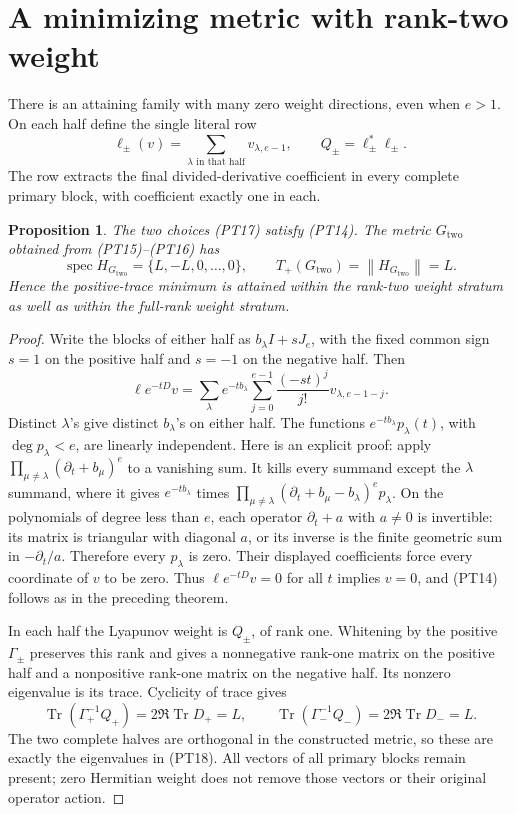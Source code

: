 \documentclass[11pt]{article}
\newcommand{\norm}[1]{\left\lVert#1\right\rVert}
\DeclareMathOperator{\Tr}{Tr}
\DeclareMathOperator{\spec}{spec}
\newtheorem{proposition}[theorem]{Proposition}
\begin{document}
\section{A minimizing metric with rank-two weight}

There is an attaining family with many zero weight directions,
even when \(e>1\). On each half define the single literal row
\begin{equation}\tag{PT17}
 \ell_\pm(v)=\sum_{\lambda\text{ in that half}}v_{\lambda,e-1},
 \qquad Q_\pm=\ell_\pm^*\ell_\pm.
\end{equation}
The row extracts the final divided-derivative coefficient in every
complete primary block, with coefficient exactly one in each.

\begin{proposition}
The two choices (PT17) satisfy (PT14). The metric
\(G_{\mathrm{two}}\) obtained from (PT15)--(PT16) has
\begin{equation}\tag{PT18}
 \spec H_{G_{\mathrm{two}}}=\{L,-L,0,\ldots,0\},\qquad
 T_+(G_{\mathrm{two}})=\norm{H_{G_{\mathrm{two}}}}=L.
\end{equation}
Hence the positive-trace minimum is attained within the rank-two
weight stratum as well as within the full-rank weight stratum.
\end{proposition}
\begin{proof}
Write the blocks of either half as \(b_\lambda I+sJ_e\), with
the fixed common sign \(s=1\) on the positive half and \(s=-1\)
on the negative half. Then
\[
 \ell e^{-tD}v
 =\sum_\lambda e^{-tb_\lambda}
      \sum_{j=0}^{e-1}\frac{(-st)^j}{j!}v_{\lambda,e-1-j}.
\]
Distinct \(\lambda\)'s give distinct \(b_\lambda\)'s on
either half. The functions \(e^{-tb_\lambda}p_\lambda(t)\),
with \(\deg p_\lambda<e\), are linearly independent. Here is
an explicit proof: apply
\(\prod_{\mu\ne\lambda}(\partial_t+b_\mu)^e\) to a
vanishing sum. It kills every summand except the \(\lambda\)
summand, where it gives \(e^{-tb_\lambda}\) times
\(\prod_{\mu\ne\lambda}(\partial_t+b_\mu-b_\lambda)^e
p_\lambda\). On the polynomials of degree less than \(e\),
each operator \(\partial_t+a\) with \(a\ne0\) is invertible:
its matrix is triangular with diagonal \(a\), or its inverse
is the finite geometric sum in \(-\partial_t/a\).
Therefore every \(p_\lambda\) is zero. Their displayed
coefficients force every coordinate of \(v\) to be zero.
Thus \(\ell e^{-tD}v=0\) for all \(t\) implies \(v=0\),
and (PT14) follows as in the preceding theorem.

In each half the Lyapunov weight is \(Q_\pm\), of rank one.
Whitening by the positive \(\Gamma_\pm\) preserves this rank
and gives a nonnegative rank-one matrix on the positive half
and a nonpositive rank-one matrix on the negative half. Its
nonzero eigenvalue is its trace. Cyclicity of trace gives
\[
 \Tr(\Gamma_+^{-1}Q_+)=2\Re\Tr D_+=L,
 \qquad\Tr(\Gamma_-^{-1}Q_-)=2\Re\Tr D_-=L.
\]
The two complete halves are orthogonal in the constructed metric,
so these are exactly the eigenvalues in (PT18). All vectors of
all primary blocks remain present; zero Hermitian weight does not
remove those vectors or their original operator action.
\end{proof}
\end{document}

